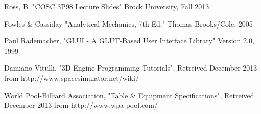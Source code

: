 
\begin{thebibliography}{1}

Ross, B. "COSC 3P98 Lecture Slides" Brock University, Fall 2013

Fowles \& Cassiday "Analytical Mechanics, 7th Ed." Thomas Brooks/Cole, 2005

Paul Rademacher, "GLUI - A GLUT-Based User Interface Library" Version 2.0, 1999

Damiano Vitulli, "3D Engine Programming Tutorials", Retreived December 2013 from
http://www.spacesimulator.net/wiki/

World Pool-Billiard Association, "Table \& Equipment Specifications", Retreived December 2013 from
http://www.wpa-pool.com/

\end{thebibliography}
